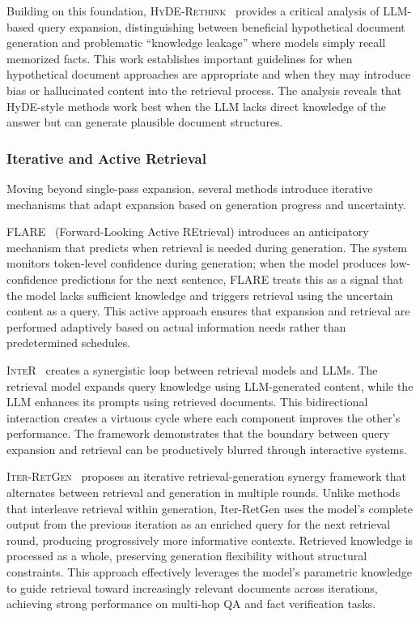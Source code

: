 \documentclass{article}
\begin{document}
Building on this foundation, \textsc{HyDE-Rethink}~\citep{HyDERethink} provides a critical analysis of LLM-based query expansion, distinguishing between beneficial hypothetical document generation and problematic ``knowledge leakage'' where models simply recall memorized facts. This work establishes important guidelines for when hypothetical document approaches are appropriate and when they may introduce bias or hallucinated content into the retrieval process. The analysis reveals that HyDE-style methods work best when the LLM lacks direct knowledge of the answer but can generate plausible document structures.

\subsubsection{Iterative and Active Retrieval}

Moving beyond single-pass expansion, several methods introduce iterative mechanisms that adapt expansion based on generation progress and uncertainty.

\textsc{FLARE}~\citep{FLARE} (Forward-Looking Active REtrieval) introduces an anticipatory mechanism that predicts when retrieval is needed during generation. The system monitors token-level confidence during generation; when the model produces low-confidence predictions for the next sentence, FLARE treats this as a signal that the model lacks sufficient knowledge and triggers retrieval using the uncertain content as a query. This active approach ensures that expansion and retrieval are performed adaptively based on actual information needs rather than predetermined schedules.

\textsc{InteR}~\citep{InteR} creates a synergistic loop between retrieval models and LLMs. The retrieval model expands query knowledge using LLM-generated content, while the LLM enhances its prompts using retrieved documents. This bidirectional interaction creates a virtuous cycle where each component improves the other's performance. The framework demonstrates that the boundary between query expansion and retrieval can be productively blurred through interactive systems.

\textsc{Iter-RetGen}~\citep{Iter-RetGen} proposes an iterative retrieval-generation synergy framework that alternates between retrieval and generation in multiple rounds. Unlike methods that interleave retrieval within generation, Iter-RetGen uses the model's complete output from the previous iteration as an enriched query for the next retrieval round, producing progressively more informative contexts. Retrieved knowledge is processed as a whole, preserving generation flexibility without structural constraints. This approach effectively leverages the model's parametric knowledge to guide retrieval toward increasingly relevant documents across iterations, achieving strong performance on multi-hop QA and fact verification tasks.
\end{document}
